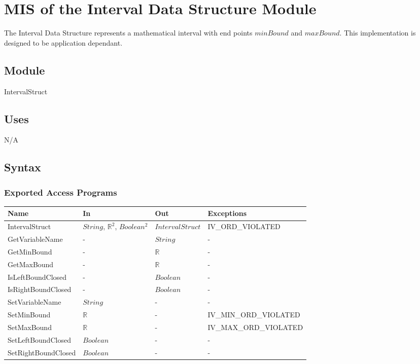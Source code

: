 \documentclass[12pt, titlepage]{article}
\begin{document}
\newpage

\section{MIS of the Interval Data Structure Module} 
\label{Module_intervaldatastructure}
The Interval Data Structure represents a mathematical interval with end points 
$minBound$ and $maxBound$. This implementation is designed to be application 
dependant.

\subsection{Module}

IntervalStruct

\subsection{Uses}

N/A

\subsection{Syntax}

\subsubsection{Exported Access Programs}

\begin{center}
	\begin{tabular}{p{3.8cm} p{2.5cm} p{3cm} p{5cm}}
		\hline
		\textbf{Name} & \textbf{In} & \textbf{Out} & \textbf{Exceptions} \\
		\hline		
		IntervalStruct & $String$, $\mathbb{R}^2$, $Boolean^2$ & 
		$IntervalStruct$ & 
		IV\_ORD\_VIOLATED \\
		GetVariableName & - & $String$ & - \\
		GetMinBound & - & $\mathbb{R}$ & - \\
		GetMaxBound & - & $\mathbb{R}$ & - \\
		IsLeftBoundClosed & - & $Boolean$ & - \\
		IsRightBoundClosed & - & $Boolean$ & - \\
		SetVariableName & $String$ & - & - \\
		SetMinBound & $\mathbb{R}$ & - & IV\_MIN\_ORD\_VIOLATED \\
		SetMaxBound & $\mathbb{R}$ & - & IV\_MAX\_ORD\_VIOLATED \\
		SetLeftBoundClosed & $Boolean$ & - & - \\
		SetRightBoundClosed & $Boolean$ & - & - \\
		\hline
	\end{tabular}
\end{center}
\end{document}
